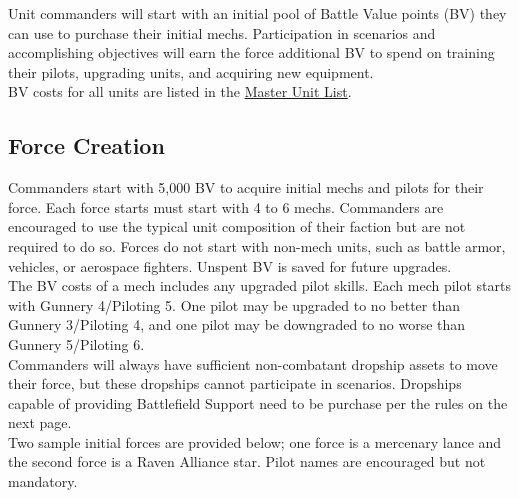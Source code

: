 \documentclass[UTF8]{article}
\begin{document}
Unit commanders will start with an initial pool of Battle Value points (BV) they can use to purchase their initial mechs.
Participation in scenarios and accomplishing objectives will earn the force additional BV to spend on training their pilots, upgrading units, and acquiring new equipment.\\

BV costs for all units are listed in the \href{http://www.masterunitlist.info/}{Master Unit List}.\\

\subsection{Force Creation}

Commanders start with 5,000 BV to acquire initial mechs and pilots for their force.
Each force starts must start with 4 to 6 mechs.
Commanders are encouraged to use the typical unit composition of their faction but are not required to do so.
Forces do not start with non-mech units, such as battle armor, vehicles, or aerospace fighters.
Unspent BV is saved for future upgrades.\\

The BV costs of a mech includes any upgraded pilot skills.
Each mech pilot starts with Gunnery 4/Piloting 5.
One pilot may be upgraded to no better than Gunnery 3/Piloting 4, and one pilot may be downgraded to no worse than Gunnery 5/Piloting 6.\\

Commanders will always have sufficient non-combatant dropship assets to move their force, but these dropships cannot participate in scenarios.
Dropships capable of providing Battlefield Support need to be purchase per the rules on the next page.\\

Two sample initial forces are provided below; one force is a mercenary lance and the second force is a Raven Alliance star.
Pilot names are encouraged but not mandatory.\\
\end{document}
